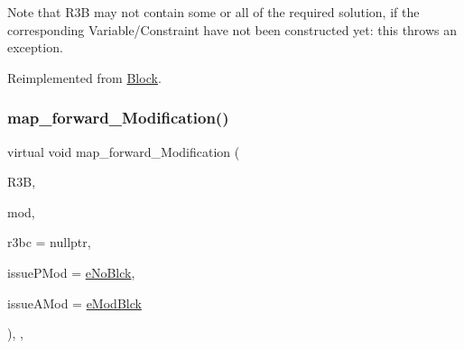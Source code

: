 Note that R3B may not contain some or all of the required solution, if the corresponding Variable/\+Constraint have not been constructed yet\+: this throws an exception. 

Reimplemented from \mbox{\hyperlink{class_s_m_spp__di__unipi__it_1_1_block_a04f0a8a608fcc3ded227c2552f67f1a3}{Block}}.

\mbox{\label{class_s_m_spp__di__unipi__it_1_1_m_c_f_block_a97c60b41fa6562804000b7324576ae31}} 
\subsubsection{\texorpdfstring{map\+\_\+forward\+\_\+\+Modification()}{map\_forward\_Modification()}}
{\footnotesize\ttfamily virtual void map\+\_\+forward\+\_\+\+Modification (\begin{DoxyParamCaption}\item[{\mbox{\hyperlink{class_s_m_spp__di__unipi__it_1_1_block}{Block}} $\ast$}]{R3B,  }\item[{\mbox{\hyperlink{group___modification___t_y_p_e_s_ga9024cf2ead61a1280d29771b063b1a62}{sp\+\_\+\+Mod}}}]{mod,  }\item[{\mbox{\hyperlink{class_s_m_spp__di__unipi__it_1_1_configuration}{Configuration}} $\ast$}]{r3bc = {\ttfamily nullptr},  }\item[{\mbox{\hyperlink{group___modification___t_y_p_e_s_ga544246d8c462e9a2d817c2c30797968f}{c\+\_\+\+Mod\+Param}}}]{issue\+P\+Mod = {\ttfamily \mbox{\hyperlink{group___modification___t_y_p_e_s_gga48fddcdd03a03f49b7e389ca1ed938d4ada69e89c5f46e563d8a13cfa6830c136}{e\+No\+Blck}}},  }\item[{\mbox{\hyperlink{group___modification___t_y_p_e_s_ga544246d8c462e9a2d817c2c30797968f}{c\+\_\+\+Mod\+Param}}}]{issue\+A\+Mod = {\ttfamily \mbox{\hyperlink{group___modification___t_y_p_e_s_gga48fddcdd03a03f49b7e389ca1ed938d4a21b14b26b1c0093a0905f6fc010bad29}{e\+Mod\+Blck}}} }\end{DoxyParamCaption})\hspace{0.3cm}{\ttfamily [final]}, {\ttfamily [override]}, {\ttfamily [virtual]}}

